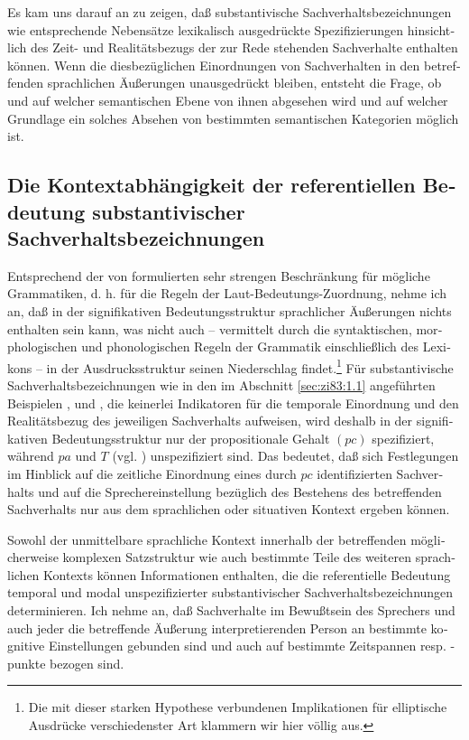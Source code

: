 \documentclass[output=paper]{langscibook}
\begin{document}
\begin{otherlanguage}{german}
Es kam uns darauf an zu zeigen, daß substantivische Sachverhaltsbezeichnungen wie entsprechende Nebensätze lexikalisch ausgedrückte Spezifizierungen hinsichtlich des Zeit- und Realitätsbezugs der zur Rede stehenden Sachverhalte enthalten können. Wenn die diesbezüglichen Einordnungen von Sachverhalten in den betreffenden sprachlichen Äußerungen unausgedrückt bleiben, entsteht die Frage, ob und auf welcher semantischen Ebene von ihnen abgesehen wird und auf welcher Grundlage ein solches Absehen von bestimmten semantischen Kategorien möglich ist.

\subsection{Die Kontextabhängigkeit der referentiellen Bedeutung substantivischer Sachverhaltsbezeichnungen}\label{sec:zi83:2.2}

Entsprechend der von \citet[5]{Bierwisch80Semantic-structure} formulierten sehr strengen Beschrän\-kung für mögliche Grammatiken, d. h. für die Regeln der Laut-Bedeutungs-Zu\-ord\-nung, nehme ich an, daß in der signifikativen Bedeutungsstruktur sprachlicher Äußerungen nichts enthalten sein kann, was nicht auch -- vermittelt durch die syntaktischen, morphologischen und phonologischen Regeln der Grammatik einschließlich des Lexikons -- in der Ausdrucksstruktur seinen Niederschlag fin\-det.\footnote{Die mit dieser starken Hypothese verbundenen Implikationen für elliptische Ausdrücke verschiedenster
Art klammern wir hier völlig aus.} Für substantivische Sachverhaltsbezeichnungen wie in den im Abschnitt \ref{sec:zi83:1.1} angeführten Bei\-spie\-len ,  und , die keinerlei Indikatoren für die temporale Einordnung und den Realitätsbezug des jeweiligen Sachverhalts auf\-wei\-sen, wird deshalb in der signifikativen Bedeutungsstruktur nur der propositionale Gehalt $(pc)$ spezifiziert, während $pa$ und $T$ (vgl. ) unspezifiziert sind. Das bedeutet, daß sich Festlegungen im Hinblick auf die zeitliche Einordnung eines durch $pc$ identifizierten Sachverhalts und auf die Sprechereinstellung bezüglich des Bestehens des betreffenden Sachverhalts nur aus dem sprachlichen oder situativen Kontext ergeben können.

Sowohl der unmittelbare sprachliche Kontext innerhalb der betreffenden mög\-li\-cher\-wei\-se komplexen Satzstruktur wie auch bestimmte Teile des weiteren sprachlichen Kontexts können Informationen enthalten, die die referentielle Bedeutung temporal und modal unspezifizierter substantivischer Sachverhaltsbezeichnungen determinieren. Ich nehme an, daß Sachverhalte im Bewußtsein des Sprechers und auch jeder die betreffende Äußerung interpretierenden Person an bestimmte kognitive Einstellungen gebunden sind und auch auf bestimmte Zeitspannen resp. -punkte bezogen sind.


\end{otherlanguage}
\end{document}
